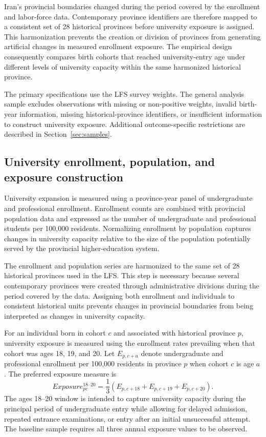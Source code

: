 Iran's provincial boundaries changed during the period covered by the enrollment and labor-force data. Contemporary province identifiers are therefore mapped to a consistent set of 28 historical provinces before university exposure is assigned. This harmonization prevents the creation or division of provinces from generating artificial changes in measured enrollment exposure. The empirical design consequently compares birth cohorts that reached university-entry age under different levels of university capacity within the same harmonized historical province.

The primary specifications use the LFS survey weights. The general analysis sample excludes observations with missing or non-positive weights, invalid birth-year information, missing historical-province identifiers, or insufficient information to construct university exposure. Additional outcome-specific restrictions are described in Section~\ref{sec:samples}.

\subsection{University enrollment, population, and exposure construction}

University expansion is measured using a province-year panel of undergraduate and professional enrollment. Enrollment counts are combined with provincial population data and expressed as the number of undergraduate and professional students per 100,000 residents. Normalizing enrollment by population captures changes in university capacity relative to the size of the population potentially served by the provincial higher-education system.

The enrollment and population series are harmonized to the same set of 28 historical provinces used in the LFS. This step is necessary because several contemporary provinces were created through administrative divisions during the period covered by the data. Assigning both enrollment and individuals to consistent historical units prevents changes in provincial boundaries from being interpreted as changes in university capacity.

For an individual born in cohort $c$ and associated with historical province $p$, university exposure is measured using the enrollment rates prevailing when that cohort was ages 18, 19, and 20. Let $E_{p,c+a}$ denote undergraduate and professional enrollment per 100,000 residents in province $p$ when cohort $c$ is age $a$. The preferred exposure measure is
\begin{equation}
Exposure_{pc}^{18\text{--}20} = \frac{1}{3}\left( E_{p,c+18} + E_{p,c+19} + E_{p,c+20} \right).
\end{equation}
The ages 18--20 window is intended to capture university capacity during the principal period of undergraduate entry while allowing for delayed admission, repeated entrance examinations, or entry after an initial unsuccessful attempt. The baseline sample requires all three annual exposure values to be observed.

